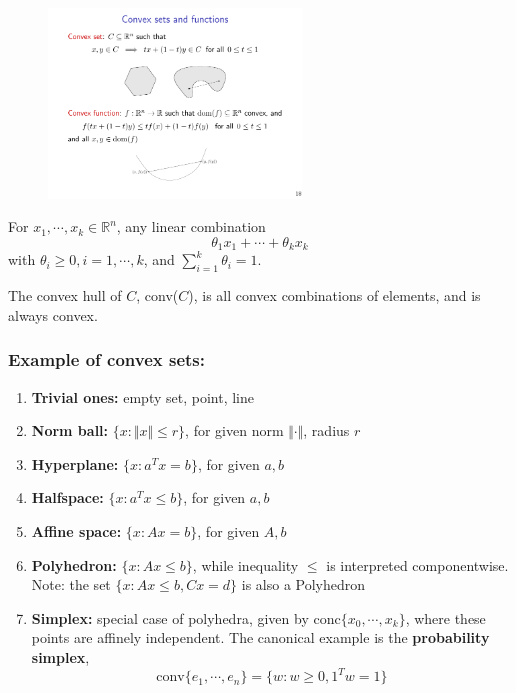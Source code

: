 \documentclass[a4paper]{article}
\begin{document}
{\begin{figure}[htbp] 
  \centering 
  \includegraphics[width=0.6\textwidth]{img/convex_set.pdf} 
\end{figure}

\begin{defi} 
  For $x_1,\cdots,x_k \in \mathbb{R}^n$, any linear combination
  \[
    \theta_1 x_1 + \cdots + \theta_k x_k
    \]
  with $\theta_i \geq 0, i=1,\cdots, k$, and $\sum_{i = 1}^{k}\theta_i = 1$. 
\end{defi}

\begin{defi} 
  The convex hull of $ C $, conv($C$), is all convex combinations of elements, and is always convex.
\end{defi}

\subsubsection{Example of convex sets:}
\begin{enumerate}
  \item \textbf{Trivial ones:} empty set, point, line 
  \item \textbf{Norm ball:} $\{x: \Vert x \Vert \leq r \}$, for given norm $\Vert \cdot \Vert$, radius $r$
  \item \textbf{Hyperplane:} $\{x: a^T x = b \}$, for given $a, b$
  \item \textbf{Halfspace:} $\{x: a^T x \leq b \}$, for given $a, b$
  \item \textbf{Affine space:} $\{x: A x = b \}$, for given $A, b$
  \item \textbf{Polyhedron:} $\{x: A x \leq b \}$, while inequality $\leq$ is interpreted componentwise. Note: the set $\{x: A x \leq b, Cx = d \}$ is also a Polyhedron
  \item \textbf{Simplex:} special case of polyhedra, given by conc$\{x_0,\cdots,x_k \}$, where these points are affinely independent. The canonical example is the \textbf{probability simplex},
  \[
    \text{conv}\{ e_1,\cdots,e_n\} = \{w: w \geq 0, 1^T w = 1\}
    \]
\end{enumerate}

}
\end{document}
